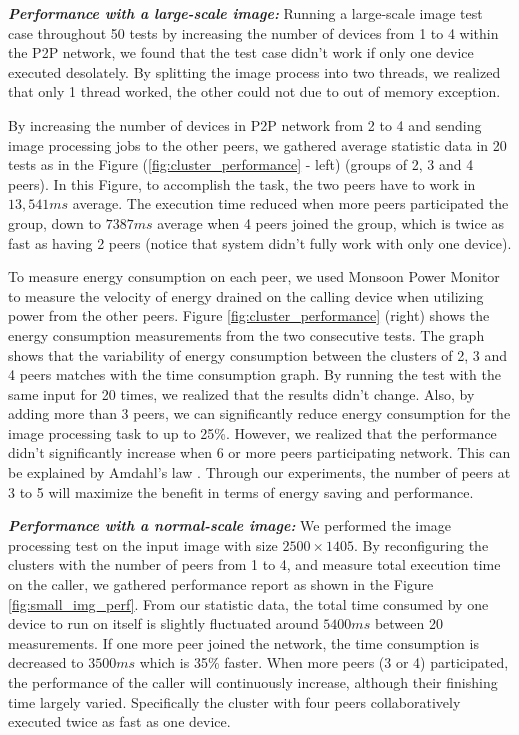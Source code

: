 \documentclass{sig-alternate}
\begin{document}
\textbf{\emph{Performance with a large-scale image:}}
Running a large-scale image test case throughout 50 tests by increasing the number of devices from 1 to 4 within the P2P network, we found that the test case didn't work if only one device executed desolately. By splitting the image process into two threads, we realized that only 1 thread worked, the other could not due to out of memory exception. 

By increasing the number of devices in P2P network from 2 to 4 and sending image processing jobs to the other peers, we gathered average statistic data in 20 tests as in the Figure (\ref{fig:cluster_performance} - left) (groups of 2, 3 and 4 peers). In this Figure, to accomplish the task, the two peers have to work in $13,541ms$ average. The execution time reduced when more peers participated the group, down to $7387ms$ average when 4 peers joined the group, which is twice as fast as having 2 peers (notice that system didn't fully work with only one device).

To measure energy consumption on each peer, we used Monsoon Power Monitor \cite{moosoon} to measure the velocity of energy drained on the calling device when utilizing power from the other peers. Figure \ref{fig:cluster_performance} (right) shows the energy consumption measurements from the two consecutive tests. The graph shows that the variability of energy consumption between the clusters of 2, 3 and 4 peers matches with the time consumption graph. By running the test with the same input for 20 times, we realized that the results didn't change. Also, by adding more than 3 peers, we can significantly reduce energy consumption for the image processing task to up to 25\%. However, we realized that the performance didn't significantly increase when 6 or more peers participating network. This can be explained by Amdahl's law \cite{amdahl}. Through our experiments, the number of peers at 3 to 5 will maximize the benefit in terms of energy saving and performance.

\textbf{\emph{Performance with a normal-scale image:}}
We performed the image processing test on the input image with size $2500 \times 1405$. By reconfiguring the clusters with the number of peers from 1 to 4, and measure total execution time on the caller, we gathered performance report as shown in the Figure \ref{fig:small_img_perf}. From our statistic data, the total time consumed by one device to run on itself is slightly fluctuated around $5400ms$ between 20 measurements. If one more peer joined the network, the time consumption is decreased to $3500ms$ which is 35\% faster. When more peers (3 or 4) participated, the performance of the caller will continuously increase, although their finishing time largely varied. Specifically the cluster with four peers collaboratively executed twice as fast as one device.
\end{document}

